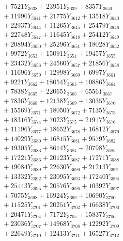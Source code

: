 \documentclass[a4paper,10pt]{article}
\begin{document}
{\begin{align}
&\;  + 7521 Y_{3638} + 23951 Y_{3639} + 8357 Y_{3640} \\[0.3ex]
&\;  + 11990 Y_{3641} + 21775 Y_{3642} + 13518 Y_{3643} \\[0.3ex]
&\;  + 22937 Y_{3644} + 11265 Y_{3645} + 25479 Y_{3646} \\[0.3ex]
&\;  + 22748 Y_{3647} + 11645 Y_{3648} + 25412 Y_{3649} \\[0.3ex]
&\;  + 20894 Y_{3650} + 25296 Y_{3651} + 18028 Y_{3652} \\[0.3ex]
&\;  + 9972 Y_{3653} + 15091 Y_{3654} + 19457 Y_{3655} \\[0.3ex]
&\;  + 23432 Y_{3656} + 24560 Y_{3657} + 21856 Y_{3658} \\[0.5ex]\allowbreak
&\;  + 11696 Y_{3659} + 12998 Y_{3660} + 6997 Y_{3661} \\[0.3ex]
&\;  + 9221 Y_{3662} + 18054 Y_{3663} + 10886 Y_{3664} \\[0.3ex]
&\;  + 7838 Y_{3665} + 22065 Y_{3666} + 6556 Y_{3667} \\[0.3ex]
&\;  + 7836 Y_{3668} + 12138 Y_{3669} + 13035 Y_{3670} \\[0.3ex]
&\;  + 15569 Y_{3671} + 18050 Y_{3672} + 7135 Y_{3673} \\[0.3ex]
&\;  + 18316 Y_{3674} + 7023 Y_{3675} + 21917 Y_{3676} \\[0.3ex]
&\;  + 11196 Y_{3677} + 18652 Y_{3678} + 16812 Y_{3679} \\[0.3ex]
&\;  + 14029 Y_{3680} + 16815 Y_{3681} + 9579 Y_{3682} \\[0.3ex]
&\;  + 19305 Y_{3683} + 8614 Y_{3684} + 20798 Y_{3685} \\[0.3ex]
&\;  + 17221 Y_{3686} + 20123 Y_{3687} + 17271 Y_{3688} \\[0.5ex]\allowbreak
&\;  + 19084 Y_{3689} + 22630 Y_{3690} + 21213 Y_{3691} \\[0.3ex]
&\;  + 13332 Y_{3692} + 23095 Y_{3693} + 17240 Y_{3694} \\[0.3ex]
&\;  + 25143 Y_{3695} + 20576 Y_{3696} + 10392 Y_{3697} \\[0.3ex]
&\;  + 7075 Y_{3698} + 16924 Y_{3699} + 10690 Y_{3700} \\[0.3ex]
&\;  + 11525 Y_{3701} + 20251 Y_{3702} + 16638 Y_{3703} \\[0.3ex]
&\;  + 20471 Y_{3704} + 7172 Y_{3705} + 15837 Y_{3706} \\[0.3ex]
&\;  + 23036 Y_{3707} + 14968 Y_{3708} + 12292 Y_{3709} \\[0.3ex]
&\;  + 22649 Y_{3710} + 12413 Y_{3711} + 16527 Y_{3712} \\[0.3ex]

\end{align}}
\end{document}

